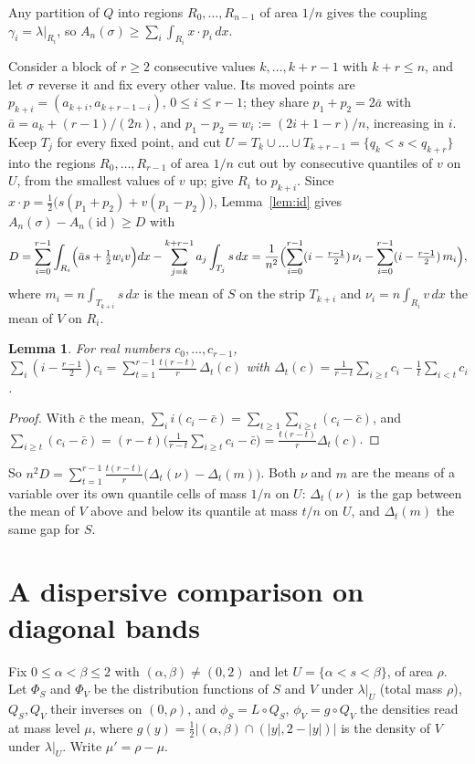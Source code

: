 \documentclass[11pt]{amsart}
\newtheorem{lemma}[theorem]{Lemma}
\theoremstyle{definition}
\theoremstyle{remark}
\numberwithin{equation}{section}
\begin{document}
Any partition of $Q$ into regions $R_0,\dots,R_{n-1}$ of area $1/n$ gives the coupling $\gamma_i=\lambda|_{R_i}$, so
$A_n(\sigma)\ge\sum_i\int_{R_i}x\cdot p_i\,dx$.

Consider a block of $r\ge 2$ consecutive values $k,\dots,k+r-1$ with $k+r\le n$, and let $\sigma$ reverse it and fix every
other value. Its moved points are $p_{k+i}=(a_{k+i},a_{k+r-1-i})$, $0\le i\le r-1$; they share
$p_1+p_2=2\bar a$ with $\bar a=a_k+(r-1)/(2n)$, and $p_1-p_2=w_i:=(2i+1-r)/n$, increasing in $i$. Keep $T_j$ for every
fixed point, and cut $U=T_k\cup\dots\cup T_{k+r-1}=\{q_k<s<q_{k+r}\}$ into the regions $R_0,\dots,R_{r-1}$ of area $1/n$
cut out by consecutive quantiles of $v$ on $U$, from the smallest values of $v$ up; give $R_i$ to $p_{k+i}$. Since
$x\cdot p=\frac12\bigl(s(p_1+p_2)+v(p_1-p_2)\bigr)$, Lemma~\ref{lem:id} gives $A_n(\sigma)-A_n(\mathrm{id})\ge D$ with
\[
D=\sum_{i=0}^{r-1}\int_{R_i}\Bigl(\bar a s+\tfrac12 w_iv\Bigr)dx-\sum_{j=k}^{k+r-1}a_j\int_{T_j}s\,dx
=\frac1{n^2}\Bigl(\sum_{i=0}^{r-1}(i-\tfrac{r-1}2)\,\nu_i-\sum_{i=0}^{r-1}(i-\tfrac{r-1}2)\,m_i\Bigr),
\]
where $m_i=n\int_{T_{k+i}}s\,dx$ is the mean of $S$ on the strip $T_{k+i}$ and $\nu_i=n\int_{R_i}v\,dx$ the mean of $V$
on $R_i$.

\begin{lemma}\label{lem:split}
For real numbers $c_0,\dots,c_{r-1}$,
$\sum_i(i-\frac{r-1}2)c_i=\sum_{t=1}^{r-1}\frac{t(r-t)}r\,\Delta_t(c)$ with
$\Delta_t(c)=\frac1{r-t}\sum_{i\ge t}c_i-\frac1t\sum_{i<t}c_i$.
\end{lemma}

\begin{proof}
With $\bar c$ the mean, $\sum_i i(c_i-\bar c)=\sum_{t\ge1}\sum_{i\ge t}(c_i-\bar c)$, and
$\sum_{i\ge t}(c_i-\bar c)=(r-t)\bigl(\frac1{r-t}\sum_{i\ge t}c_i-\bar c\bigr)=\frac{t(r-t)}r\Delta_t(c)$.
\end{proof}

So $n^2D=\sum_{t=1}^{r-1}\frac{t(r-t)}r\bigl(\Delta_t(\nu)-\Delta_t(m)\bigr)$. Both $\nu$ and $m$ are the means of a
variable over its own quantile cells of mass $1/n$ on $U$: $\Delta_t(\nu)$ is the gap between the mean of $V$ above and
below its quantile at mass $t/n$ on $U$, and $\Delta_t(m)$ the same gap for $S$.

\section{A dispersive comparison on diagonal bands}

Fix $0\le\alpha<\beta\le2$ with $(\alpha,\beta)\ne(0,2)$ and let $U=\{\alpha<s<\beta\}$, of area $\rho$. Let $\Phi_S$ and
$\Phi_V$ be the distribution functions of $S$ and $V$ under $\lambda|_U$ (total mass $\rho$), $Q_S,Q_V$ their inverses on
$(0,\rho)$, and $\phi_S=L\circ Q_S$, $\phi_V=g\circ Q_V$ the densities read at mass level $\mu$, where
$g(y)=\frac12\bigl|(\alpha,\beta)\cap(|y|,2-|y|)\bigr|$ is the density of $V$ under $\lambda|_U$. Write $\mu'=\rho-\mu$.
\end{document}
